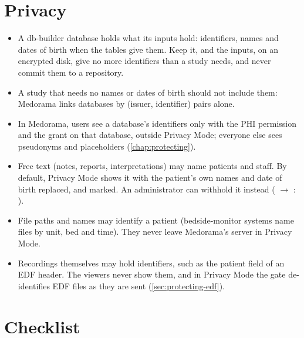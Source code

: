 \section{Privacy}
\label{sec:importing-privacy}

\begin{phibox}
\begin{itemize}
\item A db-builder database holds what its inputs hold: identifiers, names and dates of birth
  when the tables give them. Keep it, and the inputs, on an encrypted disk, give no more
  identifiers than a study needs, and never commit them to a repository.
\item A study that needs no names or dates of birth should not include them: Medorama links
  databases by (issuer, identifier) pairs alone.
\item In Medorama, users see a database's identifiers only with the PHI permission and the grant
   on that database, outside Privacy Mode; everyone else sees pseudonyms and
  placeholders (\cref{chap:protecting}).
\item Free text (notes, reports, interpretations) may name patients and staff. By default,
  Privacy Mode shows it with the patient's own names and date of birth replaced, and marked. An
  administrator can withhold it instead ( $\rightarrow$ : ).
\item File paths and names may identify a patient (bedside-monitor systems name files by unit,
  bed and time). They never leave Medorama's server in Privacy Mode.
\item Recordings themselves may hold identifiers, such as the patient field of an EDF header.
  The viewers never show them, and in Privacy Mode the gate de-identifies EDF files as they are
  sent (\cref{sec:protecting-edf}).
\end{itemize}
\end{phibox}

\section{Checklist}
\label{sec:importing-checklist}

